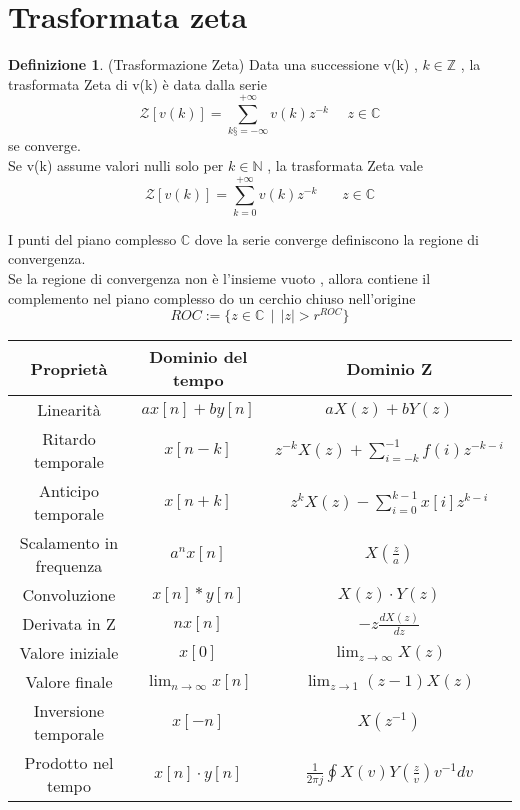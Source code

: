 \documentclass{article}
\theoremstyle{definition}
\newtheorem*{definizione}{Definizione}
\newcommand{\C}{\mathbb{C}}
\renewcommand{\arraystretch}{1.5} %
\begin{document}
\section{Trasformata zeta}
	\begin{definizione}(Trasformazione Zeta)
	Data una successione v(k) , $k \in \mathbb{Z}$ , la trasformata Zeta di v(k) è data dalla serie 
	$$\mathcal{Z}[v(k)]=\sum_{k§=-\infty}^{+\infty}v(k)z^{-k} \ \ \ \ \ \ z \in \C$$ se converge.\\
	Se v(k) assume valori nulli solo per $k\in\mathbb{N}$ , la trasformata Zeta vale 
	$$\mathcal{Z}[v(k)]=\sum_{k=0}^{+\infty}v(k)z^{-k } \ \ \ \ \ \ \ \ z \in \C$$
	
	\end{definizione}
I punti del piano complesso $\C$ dove la serie converge definiscono la regione di convergenza. \\ Se la regione di convergenza non è l'insieme vuoto , allora contiene il complemento nel piano complesso do un cerchio chiuso nell'origine 
$$ROC := \{z\in\C \ \ |\ \ |z|>r^{ROC} \}$$
\begin{center}
	\renewcommand{\arraystretch}{1.5}
	\begin{tabular}{|c|c|c|}
		\hline
		\textbf{Proprietà} & \textbf{Dominio del tempo} & \textbf{Dominio Z} \\ 
		\hline
		Linearità & $a x[n] + b y[n]$ & $a X(z) + b Y(z)$ \\
		\hline
		Ritardo temporale & $x[n - k]$ & $z^{-k}X(z)+\sum_{i=-k}^{-1}f(i)z^{-k-i}$ \\
		\hline
		Anticipo temporale & $x[n + k]$ & $z^{k}X(z) - \sum_{i=0}^{k-1} x[i]z^{k-i}$ \\
		\hline
		Scalamento in frequenza & $a^n x[n]$ & $X\left(\frac{z}{a}\right)$ \\
		\hline
		Convoluzione & $x[n] * y[n]$ & $X(z) \cdot Y(z)$ \\
		\hline
		Derivata in Z & $n x[n]$ & $-z \frac{dX(z)}{dz}$ \\
		\hline
		Valore iniziale & $x[0]$ & $\lim_{z \to \infty} X(z)$ \\
		\hline
		Valore finale & $\lim_{n \to \infty} x[n]$ & $\lim_{z \to 1} (z-1)X(z)$ \\
		\hline
		Inversione temporale & $x[-n]$ & $X(z^{-1})$ \\
		\hline
		Prodotto nel tempo & $x[n] \cdot y[n]$ & $\frac{1}{2\pi j} \oint X(v) Y\left(\frac{z}{v}\right) v^{-1} dv$ \\
		\hline
	\end{tabular}
\end{center}
\end{document}
